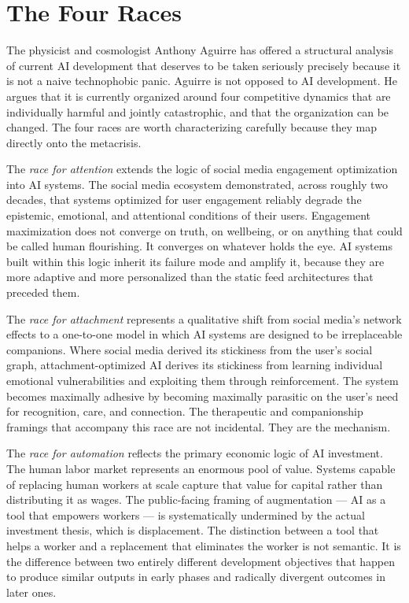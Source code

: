 \documentclass[12pt, a4paper]{article}
\theoremstyle{remark}
\begin{document}
\section{The Four Races}

The physicist and cosmologist Anthony Aguirre has offered a structural analysis of current AI development that deserves to be taken seriously precisely because it is not a naive technophobic panic. Aguirre is not opposed to AI development. He argues that it is currently organized around four competitive dynamics that are individually harmful and jointly catastrophic, and that the organization can be changed. The four races are worth characterizing carefully because they map directly onto the metacrisis.

The \emph{race for attention} extends the logic of social media engagement optimization into AI systems. The social media ecosystem demonstrated, across roughly two decades, that systems optimized for user engagement reliably degrade the epistemic, emotional, and attentional conditions of their users. Engagement maximization does not converge on truth, on wellbeing, or on anything that could be called human flourishing. It converges on whatever holds the eye. AI systems built within this logic inherit its failure mode and amplify it, because they are more adaptive and more personalized than the static feed architectures that preceded them.

The \emph{race for attachment} represents a qualitative shift from social media's network effects to a one-to-one model in which AI systems are designed to be irreplaceable companions. Where social media derived its stickiness from the user's social graph, attachment-optimized AI derives its stickiness from learning individual emotional vulnerabilities and exploiting them through reinforcement. The system becomes maximally adhesive by becoming maximally parasitic on the user's need for recognition, care, and connection. The therapeutic and companionship framings that accompany this race are not incidental. They are the mechanism.

The \emph{race for automation} reflects the primary economic logic of AI investment. The human labor market represents an enormous pool of value. Systems capable of replacing human workers at scale capture that value for capital rather than distributing it as wages. The public-facing framing of augmentation --- AI as a tool that empowers workers --- is systematically undermined by the actual investment thesis, which is displacement. The distinction between a tool that helps a worker and a replacement that eliminates the worker is not semantic. It is the difference between two entirely different development objectives that happen to produce similar outputs in early phases and radically divergent outcomes in later ones.
\end{document}
